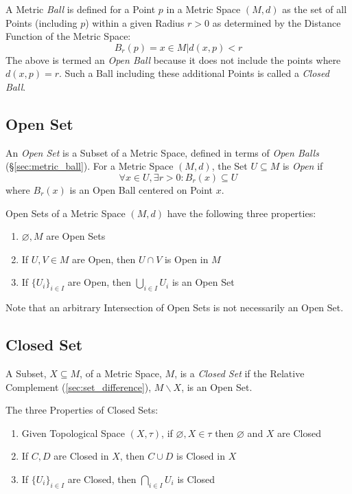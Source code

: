 A Metric \emph{Ball} is defined for a Point $p$ in a Metric Space
$(M,d)$ as the set of all Points (including $p$) within a given Radius
$r > 0$ as determined by the Distance Function of the Metric Space:
\[
    B_r(p) = {x \in M | d(x,p) < r }
\]
The above is termed an \emph{Open Ball} because it does not include
the points where $d(x,p) = r$. Such a Ball including these additional
Points is called a \emph{Closed Ball}.



\subsection{Open Set}\label{sec:open_set}

An \emph{Open Set} is a Subset of a Metric Space, defined in terms of
\emph{Open Balls} (\S\ref{sec:metric_ball}). For a Metric Space
$(M,d)$, the Set $U \subseteq M$ is \emph{Open} if
\[
    \forall x \in U, \exists r > 0 : B_r(x) \subseteq U
\]
where $B_r(x)$ is an Open Ball centered on Point $x$.

Open Sets of a Metric Space $(M,d)$ have the following three
properties:
\begin{enumerate}
\item $\varnothing, M$ are Open Sets
\item If $U, V \in M$ are Open, then $U \cap V$ is Open in $M$
\item If $\{ U_i \}_{i \in I}$ are Open, then $\bigcup_{i \in I}
  U_i$ is an Open Set
\end{enumerate}
Note that an arbitrary Intersection of Open Sets is not necessarily an
Open Set.



\subsection{Closed Set}\label{sec:closed_set}

A Subset, $X \subseteq M$, of a Metric Space, $M$, is a \emph{Closed
  Set} if the Relative Complement (\ref{sec:set_difference}), $M
\backslash X$, is an Open Set.

The three Properties of Closed Sets:
\begin{enumerate}
\item Given Topological Space $(X, \tau)$, if $\varnothing, X \in
  \tau$ then $\varnothing$ and $X$ are Closed
\item If $C, D$ are Closed in $X$, then $C \cup D$ is Closed in $X$
\item If $\{ U_i \}_{i \in I}$ are Closed, then $\bigcap_{i \in I}
  U_i$ is Closed
\end{enumerate}

